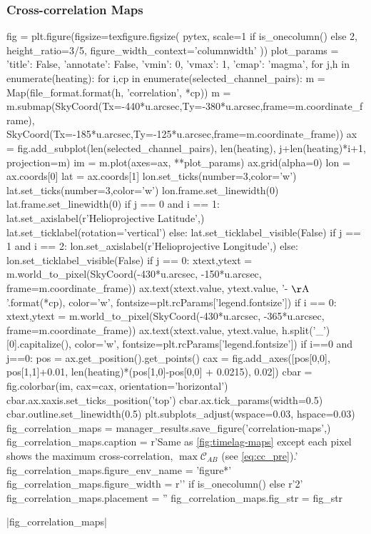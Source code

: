 \subsubsection{Cross-correlation Maps}\label{cross_correlation_maps}

\begin{pycode}
fig = plt.figure(figsize=texfigure.figsize(
    pytex,
    scale=1 if is_onecolumn() else 2,
    height_ratio=3/5,
    figure_width_context='columnwidth'
))
plot_params = {'title': False, 'annotate': False, 'vmin': 0, 'vmax': 1, 'cmap': 'magma',}
for j,h in enumerate(heating):
    for i,cp in enumerate(selected_channel_pairs):
        m = Map(file_format.format(h, 'correlation', *cp))
        m = m.submap(SkyCoord(Tx=-440*u.arcsec,Ty=-380*u.arcsec,frame=m.coordinate_frame),
                     SkyCoord(Tx=-185*u.arcsec,Ty=-125*u.arcsec,frame=m.coordinate_frame))
        ax = fig.add_subplot(len(selected_channel_pairs), len(heating), j+len(heating)*i+1,
                             projection=m)
        im = m.plot(axes=ax, **plot_params)
        ax.grid(alpha=0)
        lon = ax.coords[0]
        lat = ax.coords[1]
        lon.set_ticks(number=3,color='w')
        lat.set_ticks(number=3,color='w')
        lon.frame.set_linewidth(0)
        lat.frame.set_linewidth(0)
        if j == 0 and i == 1:
            lat.set_axislabel(r'Helioprojective Latitude',)
            lat.set_ticklabel(rotation='vertical')
        else:
            lat.set_ticklabel_visible(False)
        if j == 1 and i == 2:
            lon.set_axislabel(r'Helioprojective Longitude',)
        else:
            lon.set_ticklabel_visible(False)
        if j == 0:
            xtext,ytext = m.world_to_pixel(SkyCoord(-430*u.arcsec, -150*u.arcsec, frame=m.coordinate_frame))
            ax.text(xtext.value, ytext.value, '{}-{} $\mathrm{{\AA}}$'.format(*cp),
                    color='w', fontsize=plt.rcParams['legend.fontsize'])
        if i == 0:
            xtext,ytext = m.world_to_pixel(SkyCoord(-430*u.arcsec, -365*u.arcsec, frame=m.coordinate_frame))
            ax.text(xtext.value, ytext.value, h.split('_')[0].capitalize(),
                color='w', fontsize=plt.rcParams['legend.fontsize'])
        if i==0 and j==0:
            pos = ax.get_position().get_points()
            cax = fig.add_axes([pos[0,0], pos[1,1]+0.01, len(heating)*(pos[1,0]-pos[0,0] + 0.0215), 0.02])
            cbar = fig.colorbar(im, cax=cax, orientation='horizontal')
            cbar.ax.xaxis.set_ticks_position('top')
            cbar.ax.tick_params(width=0.5)
            cbar.outline.set_linewidth(0.5)
plt.subplots_adjust(wspace=0.03, hspace=0.03)
fig_correlation_maps = manager_results.save_figure('correlation-maps',)
fig_correlation_maps.caption = r'Same as \autoref{fig:timelag-maps} except each pixel shows the maximum cross-correlation, $\max\mathcal{C}_{AB}$ (see \autoref{eq:cc_pre}).'
fig_correlation_maps.figure_env_name = 'figure*'
fig_correlation_maps.figure_width = r'\columnwidth' if is_onecolumn() else r'2\columnwidth'
fig_correlation_maps.placement = ''
fig_correlation_maps.fig_str = fig_str
\end{pycode}
|fig_correlation_maps|

